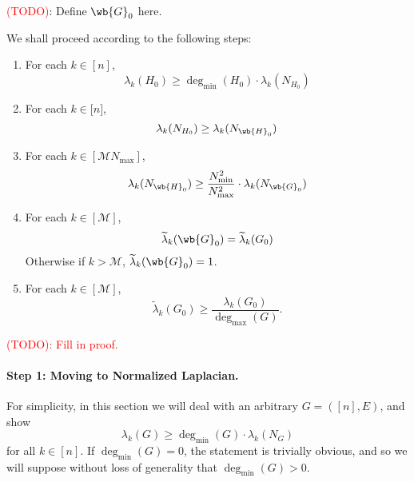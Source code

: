 \documentclass{article}
\newcommand{\1}{\mathbf{1}}
\newcommand{\wt}[1]{\widetilde{#1}}
\newcommand{\mc}[1]{\mathcal{#1}}
\theoremstyle{alden}
\theoremstyle{aldenthm}
\theoremstyle{definition}
\theoremstyle{remark}
\begin{document}
\textcolor{red}{(TODO)}: Define $\wb{G}_0$ here.

We shall proceed according to the following steps:
\begin{enumerate}
	\item For each $k \in [n]$, 
	\begin{equation}
	\label{eqn:alden_product_eigenvalue_pf1}
	\lambda_k(H_0) \geq \deg_{\min}(H_0) \cdot \lambda_k(N_{H_0})
	\end{equation}
	\item For each $k \in \bigl[n\bigr]$,
	\begin{equation}
	\label{eqn:alden_product_eigenvalue_pf2}
	\lambda_k(N_{H_0}) \geq \lambda_k(N_{\wb{H}_0})
	\end{equation}
	\item For each $k \in [\mc{M} N_{\max}]$, 
	\begin{equation}
	\label{eqn:alden_product_eigenvalue_pf3}
	\lambda_k(N_{\wb{H}_0}) \geq \frac{N_{\min}^2}{N_{\max}^2} \cdot \lambda_k(N_{\wb{G}_0})
	\end{equation}
	\item For each $k \in [\mc{M}]$,
	\begin{equation}
	\label{eqn:alden_product_eigenvalue_pf4}
	\wt{\lambda}_k(\wb{G}_0) = \wt{\lambda}_k(G_0)
	\end{equation}
	Otherwise if $k > \mc{M}$, $\wt{\lambda}_k(\wb{G}_0) = 1$.
	\item For each $k \in [\mc{M}]$,
	\begin{equation*}
	\wt{\lambda}_k(G_0) \geq \frac{\lambda_k(G_0)}{\deg_{\max}(G)}.
	\end{equation*}
\end{enumerate}

\textcolor{red}{(TODO): Fill in proof.}

\paragraph{Step 1: Moving to Normalized Laplacian.}
For simplicity, in this section we will deal with an arbitrary $G = ([n], E)$, and show
\begin{equation*}
\lambda_k(G) \geq \deg_{\min}(G) \cdot \lambda_k(N_G)
\end{equation*}
for all $k \in [n]$. If $\deg_{\min}(G) = 0$, the statement is trivially obvious, and so we will suppose without loss of generality that $\deg_{\min}(G) > 0$.
\end{document}
